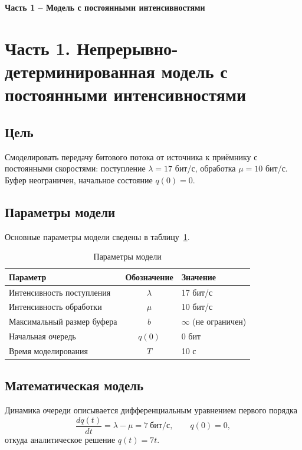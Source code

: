 \documentclass[a4paper,12pt]{article}
\begin{document}
\begin{center}
    \textbf{\large Часть 1 -- Модель с постоянными интенсивностями}
\end{center}
\vspace{5mm}

\section*{Часть 1. Непрерывно-детерминированная модель с постоянными интенсивностями}

\subsection*{Цель}
Смоделировать передачу битового потока от источника к приёмнику с постоянными скоростями:
поступление $\lambda = 17$ бит/с, обработка $\mu = 10$ бит/с. Буфер неограничен, начальное
состояние $q(0)=0$.

\subsection*{Параметры модели}
Основные параметры модели сведены в таблицу~\ref{tab:params}.

\begin{table}[h!]
    \centering
    \caption{Параметры модели}
    \label{tab:params}
    \begin{tabular}{|l|c|l|}
        \hline
        Параметр & Обозначение & Значение \\
        \hline
        Интенсивность поступления & $\lambda$ & 17 бит/с \\
        Интенсивность обработки   & $\mu$    & 10 бит/с \\
        Максимальный размер буфера & $b$     & $\infty$ (не ограничен) \\
        Начальная очередь         & $q(0)$  & 0 бит \\
        Время моделирования       & $T$     & 10 с \\
        \hline
    \end{tabular}
\end{table}

\subsection*{Математическая модель}
Динамика очереди описывается дифференциальным уравнением первого порядка
\[
\frac{dq(t)}{dt} = \lambda - \mu = 7\ \text{бит/с}, \qquad q(0)=0,
\]
откуда аналитическое решение $q(t) = 7t$.
\end{document}
